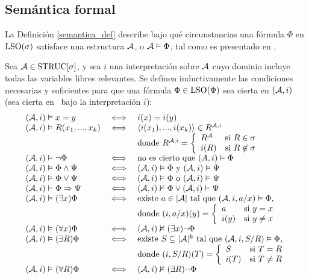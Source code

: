 \subsection{Semántica formal}
La Definición \ref{semantica_def} describe bajo qué circunstancias una fórmula $\Phi$ en
$\text{LSO}(\sigma)$ satisface una estructura $\mathcal{A}$, o $\mathcal{A} \vDash \Phi$, tal como es
presentado en \cite{immerman:book}.

\begin{definition}
\label{semantica_def}
Sea $\mathcal{A} \in \text{STRUC}[\sigma]$, y sea $i$ una interpretación sobre $\mathcal{A}$ cuyo
dominio incluye todas las variables libres relevantes. 
Se definen inductivamente las condiciones necesarias y suficientes para que 
una fórmula $\Phi \in \text{LSO}(\Phi)$ sea cierta en $(\mathcal{A}, i)$ (sea cierta en \A\ bajo la
interpretación $i$):
\[
\begin{array}{lcl}
(\mathcal{A}, i) \vDash x = y & \iff & i(x) = i(y)\\
(\mathcal{A}, i) \vDash R(x_1,...,x_{k}) & \iff & \langle i(x_1),...,i(x_{k}) \rangle \in R^{\mathcal{A}, i}\\
&&\mbox{donde } R^{\mathcal{A}, i}= \left\{
    \begin{array}{lr}
       R^{\mathcal{A}} & \mbox{si } R \in \sigma\\
       i(R) & \mbox{si } R \not\in \sigma
     \end{array}
   \right.\\
(\mathcal{A}, i) \vDash \neg \Phi & \iff & \mbox{no es cierto que } (A, i) \vDash \Phi\\
(\mathcal{A}, i) \vDash \Phi \land \Psi & \iff & (\mathcal{A}, i) \vDash \Phi \mbox{ y } (\mathcal{A}, i) \vDash \Psi\\
(\mathcal{A}, i) \vDash \Phi \lor \Psi & \iff & (\mathcal{A}, i) \vDash \Phi \mbox{ o } (\mathcal{A}, i) \vDash \Psi\\
(\mathcal{A}, i) \vDash \Phi \Rightarrow \Psi & \iff & (\mathcal{A}, i) \nvDash \Phi \lor (\mathcal{A}, i) \vDash \Psi\\
(\mathcal{A}, i) \vDash (\exists x) \Phi & \iff & \mbox{existe } a \in |\mathcal{A}| 
\mbox{ tal que } (\mathcal{A}, i, a/x) \vDash \Phi,\\
&&\mbox{donde } (i, a/x)(y) = \left\{
     \begin{array}{lr}
       a & \mbox{si } y = x\\
       i(y) & \mbox{si } y \not= x
     \end{array}
   \right.\\
(\mathcal{A}, i) \vDash (\forall x) \Phi & \iff &
    (\mathcal{A}, i) \nvDash (\exists x) \neg \Phi\\
(\mathcal{A}, i) \vDash (\exists R) \Phi & \iff & \mbox{existe } S \subseteq |\mathcal{A}|^k
\mbox{ tal que } (\mathcal{A}, i, S/R) \vDash \Phi,\\
&&\mbox{donde } (i, S/R)(T) = \left\{
     \begin{array}{lr}
       S & \mbox{si } T = R\\
       i(T) & \mbox{si } T \not= R
     \end{array}
   \right.\\
(\mathcal{A}, i) \vDash (\forall R) \Phi & \iff &
    (\mathcal{A}, i) \nvDash (\exists R) \neg \Phi\\
\end{array}
\]
\end{definition}

